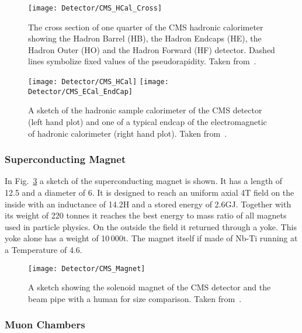 \begin{figure}[Htb]
    \centering
    \texttt{[image: Detector/CMS\_HCal\_Cross]}
    \caption[Cross section of the CMS hadronic calorimeter]{The cross section of one quarter of the CMS hadronic calorimeter showing the Hadron Barrel (HB), the Hadron Endcaps (HE), the Hadron Outer (HO) and the Hadron Forward (HF) detector. Dashed lines symbolize fixed values of the pseudorapidity. Taken from~. \label{plot:LHCCMSHCalCross}}
\end{figure}

\begin{figure}[Htb]
  \centering
  \texttt{[image: Detector/CMS\_HCal]}
  \texttt{[image: Detector/CMS\_ECal\_EndCap]}
  \caption[Sketches of the hadronic calorimeter of CMS]{A sketch of the hadronic sample calorimeter of the CMS detector (left hand plot) and one of a typical endcap of the electromagnetic of hadronic calorimeter (right hand plot). Taken from~. \label{plot:LHCCMSHCalCMS}}
\end{figure}

\subsubsection{Superconducting Magnet}

In Fig.~\ref{plot:LHCCMSMagnetCMS} a sketch of the superconducting magnet is shown. It has a length of 12.5\m{} and a diameter of 6\m{}. It is designed to reach an uniform axial 4\unit{T} field on the inside with an inductance of 14.2\unit{H} and a stored energy of 2.6\unit{GJ}. Together with its weight of 220 tonnes it reaches the best energy to mass ratio of all magnets used in particle physics. On the outside the field it returned through a yoke. This yoke alone has a weight of 10\,000\unit{t}. The magnet itself if made of Nb-Ti running at a Temperature of 4.6\K{}.

\begin{figure}[Htb]
  \centering
  \texttt{[image: Detector/CMS\_Magnet]}
  \caption[Sketch of the solenoid magnet]{A sketch showing the solenoid magnet of the CMS detector and the beam pipe with a human for size comparison. Taken from~. \label{plot:LHCCMSMagnetCMS}}
\end{figure}

\subsubsection{Muon Chambers}

